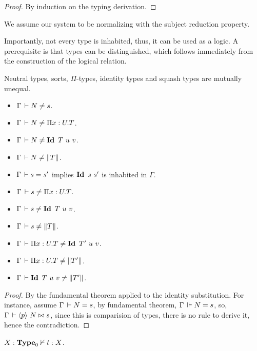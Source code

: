\documentclass[a4paper,english]{lipics-utf8x}
\begin{document}
  \begin{proof}
    By induction on the typing derivation.
  \end{proof}


  We assume our system to be normalizing with the subject reduction property.


  Importantly, not every type is inhabited, thus, it can be used as a logic.
  A prerequisite is that types can be distinguished, which follows immediately
  from the construction of the logical relation.

  \begin{lemma}
    \label{lem:cons-discr}
    Neutral types, sorts, $\Pi$-types, identity types and
    squash types are mutually unequal.
    \leavevmode
    \begin{itemize}
      \item $\Gamma \,\vdash N \neq s$.
      \item $\Gamma \,\vdash N \neq \Pi x:U.T$.
      \item $\Gamma \der N \neq \Id T\ u\ v$.
      \item $\Gamma \,\vdash N \neq \|T\|$.
      \item $\Gamma \,\vdash s = s'$ implies $\operatorname{\mathbf{Id}~} s\ s'$ is inhabited in $\Gamma$.
      \item $\Gamma \,\vdash s \neq \Pi x:U.T$.
      \item $\Gamma \der s \neq \Id T\ u\ v$.
      \item $\Gamma \,\vdash s \neq \|T\|$.
      \item $\Gamma \der \Pi x:U.T \neq \Id T'\ u\ v$.
      \item $\Gamma \,\vdash \Pi x:U.T \neq \|T'\|$.
      \item $\Gamma \,\vdash \operatorname{\mathbf{Id}~} T\ u\ v \neq \|T'\|$.
    \end{itemize}
  \end{lemma}

  \begin{proof}
    By the fundamental theorem applied to the identity substitution.
    For instance, assume $\Gamma \,\vdash N = s$, by fundamental theorem,
    $\Gamma \,\Vdash N = s$, so, $\Gamma \,\vdash \langle p \rangle~ N \mathrel{\bowtie} s$, since this is
    comparision of types, there is no rule to derive it, hence the
    contradiction.
  \end{proof}

  \begin{theorem}[Consistency]
    $X : \operatorname{\mathbf{Type}}_0 \nvdash t : X$.
  \end{theorem}
\end{document}

